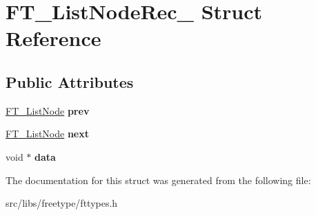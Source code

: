 \hypertarget{struct_f_t___list_node_rec__}{
\section{FT\_\-ListNodeRec\_\- Struct Reference}
\label{struct_f_t___list_node_rec__}
}
\subsection*{Public Attributes}
\begin{DoxyCompactItemize}
\item 
\hypertarget{struct_f_t___list_node_rec___a41c77950e6940b1b98e04709b705c046}{
\hyperlink{struct_f_t___list_node_rec__}{FT\_\-ListNode} {\bfseries prev}}
\label{struct_f_t___list_node_rec___a41c77950e6940b1b98e04709b705c046}

\item 
\hypertarget{struct_f_t___list_node_rec___a8275962fa8c92b77435cb4fa76251f39}{
\hyperlink{struct_f_t___list_node_rec__}{FT\_\-ListNode} {\bfseries next}}
\label{struct_f_t___list_node_rec___a8275962fa8c92b77435cb4fa76251f39}

\item 
\hypertarget{struct_f_t___list_node_rec___ab0202be88f722442a4bec9aeb5f6418f}{
void $\ast$ {\bfseries data}}
\label{struct_f_t___list_node_rec___ab0202be88f722442a4bec9aeb5f6418f}

\end{DoxyCompactItemize}


The documentation for this struct was generated from the following file:\begin{DoxyCompactItemize}
\item 
src/libs/freetype/fttypes.h\end{DoxyCompactItemize}
